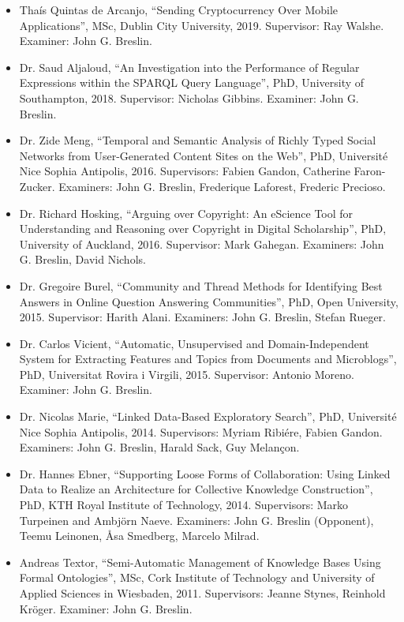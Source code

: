 \documentclass[10pt,a4paper]{res} %
\begin{document}
\begin{resume}
\begin{itemize}
\item Tha\'{i}s Quintas de Arcanjo, ``Sending Cryptocurrency Over Mobile Applications'', MSc, Dublin City University, 2019. Supervisor: Ray Walshe. Examiner: John G. Breslin.
\item Dr. Saud Aljaloud, ``An Investigation into the Performance of Regular Expressions within the SPARQL Query Language'', PhD, University of Southampton, 2018. Supervisor: Nicholas Gibbins. Examiner: John G. Breslin. %
\item Dr. Zide Meng, ``Temporal and Semantic Analysis of Richly Typed Social Networks from User-Generated Content Sites on the Web'', PhD, Universit\'{e} Nice Sophia Antipolis, 2016. Supervisors: Fabien Gandon, Catherine Faron-Zucker. Examiners: John G. Breslin, Frederique Laforest, Frederic Precioso. %
\item Dr. Richard Hosking, ``Arguing over Copyright: An eScience Tool for Understanding and Reasoning over Copyright in Digital Scholarship'', PhD, University of Auckland, 2016. Supervisor: Mark Gahegan. Examiners: John G. Breslin, David Nichols.
\item Dr. Gregoire Burel, ``Community and Thread Methods for Identifying Best Answers in Online Question Answering Communities'', PhD, Open University, 2015. Supervisor: Harith Alani. Examiners: John G. Breslin, Stefan Rueger. %
\item Dr. Carlos Vicient, ``Automatic, Unsupervised and Domain-Independent System for Extracting Features and Topics from Documents and Microblogs'', PhD, Universitat Rovira i Virgili, 2015. Supervisor: Antonio Moreno. Examiner: John G. Breslin.
\item Dr. Nicolas Marie, ``Linked Data-Based Exploratory Search'', PhD, Universit\'{e} Nice Sophia Antipolis, 2014. Supervisors: Myriam Ribi\'{e}re, Fabien Gandon. Examiners: John G. Breslin, Harald Sack, Guy Melan\c{c}on.
\item Dr. Hannes Ebner, ``Supporting Loose Forms of Collaboration: Using Linked Data to Realize an Architecture for Collective Knowledge Construction'', PhD, KTH Royal Institute of Technology, 2014. Supervisors: Marko Turpeinen and Ambj{\"o}rn Naeve. Examiners: John G. Breslin (Opponent), Teemu Leinonen, \r{A}sa Smedberg, Marcelo Milrad.
\item Andreas Textor, ``Semi-Automatic Management of Knowledge Bases Using Formal Ontologies'', MSc, Cork Institute of Technology and University of Applied Sciences in Wiesbaden, 2011. Supervisors: Jeanne Stynes, Reinhold Kr{\"o}ger. Examiner: John G. Breslin.
\end{itemize}


\end{resume}
\end{document}

